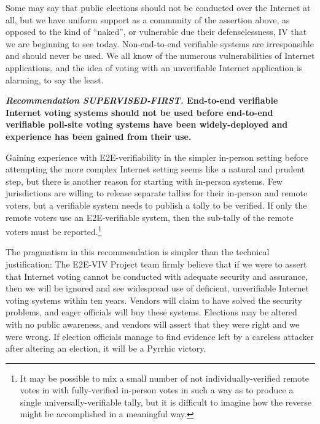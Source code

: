 Some may say that public elections should not be conducted over the
Internet at all, but we have uniform support as a community of the
assertion above, as opposed to the kind of ``naked'', or vulnerable
due their defenselessness, IV that we are beginning to see
today. Non-end-to-end verifiable systems are irresponsible and should
never be used. We all know of the numerous vulnerabilities of Internet
applications, and the idea of voting with an unverifiable Internet
application is alarming, to say the least.

\begin{center}
  \textbf{\emph{Recommendation SUPERVISED-FIRST.} End-to-end
    verifiable Internet voting systems should not be used before
    end-to-end verifiable poll-site voting systems have been
    widely-deployed and experience has been gained from their use.}
\end{center}

Gaining experience with E2E-verifiability in the simpler in-person
setting before attempting the more complex Internet setting seems like
a natural and prudent step, but there is another reason for starting
with in-person systems.  Few jurisdictions are willing to release
separate tallies for their in-person and remote voters, but a
verifiable system needs to publish a tally to be verified.  If only
the remote voters use an E2E-verifiable system, then the sub-tally of
the remote voters must be reported.\footnote{It may be possible to mix
  a small number of not individually-verified remote votes in with
  fully-verified in-person votes in such a way as to produce a single
  universally-verifiable tally, but it is difficult to imagine how the
  reverse might be accomplished in a meaningful way.}
 
The pragmatism in this recommendation is simpler than the technical
justification: The E2E-VIV Project team firmly believe that if we
were to assert that Internet voting cannot be conducted with adequate
security and assurance, then we will be ignored and see widespread use
of deficient, unverifiable Internet voting systems within ten years.
Vendors will claim to have solved the security problems, and eager
officials will buy these systems.  Elections may be altered with no
public awareness, and vendors will assert that they were right and we
were wrong.  If election officials manage to find
evidence left by a careless attacker after altering an election, it
will be a Pyrrhic victory.
 
